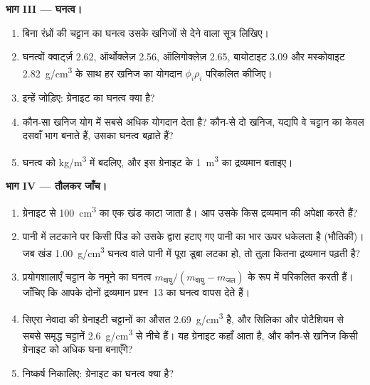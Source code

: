 \begin{problem}
\medskip
\noindent\textbf{भाग III --- घनत्व।}
\begin{enumerate}[resume]
  \item बिना रंध्रों की चट्टान का घनत्व उसके खनिजों से देने वाला सूत्र
        लिखिए।
  \item घनत्वों क्वार्ट्ज़ \qty{2.62}{}, ऑर्थोक्लेज़ \qty{2.56}{},
        ऑलिगोक्लेज़ \qty{2.65}{}, बायोटाइट \qty{3.09}{} और मस्कोवाइट
        \qty{2.82}{g/cm^3} के साथ हर खनिज का योगदान $\phi_i \rho_i$
        परिकलित कीजिए।
  \item इन्हें जोड़िए: ग्रेनाइट का घनत्व क्या है?
  \item कौन-सा खनिज योग में सबसे अधिक योगदान देता है? कौन-से दो खनिज,
        यद्यपि वे चट्टान का केवल दसवाँ भाग बनाते हैं, उसका घनत्व बढ़ाते हैं?
  \item घनत्व को \unit{kg/m^3} में बदलिए, और इस ग्रेनाइट के
        \qty{1}{m^3} का द्रव्यमान बताइए।
\end{enumerate}

\medskip
\noindent\textbf{भाग IV --- तौलकर जाँच।}
\begin{enumerate}[resume]
  \item ग्रेनाइट से \qty{100}{cm^3} का एक खंड काटा जाता है। आप उसके किस द्रव्यमान की
        अपेक्षा करते हैं?
  \item पानी में लटकाने पर किसी पिंड को उसके द्वारा हटाए गए पानी का भार ऊपर
        धकेलता है (भौतिकी)। जब खंड \qty{1.00}{g/cm^3} घनत्व वाले पानी में
        पूरा डूबा लटका हो, तो तुला कितना द्रव्यमान पढ़ती है?
  \item प्रयोगशालाएँ चट्टान के नमूने का घनत्व
        $m_{\text{वायु}}/(m_{\text{वायु}} - m_{\text{जल}})$ के रूप में परिकलित करती हैं। जाँचिए कि
        आपके दोनों द्रव्यमान प्रश्न~13 का घनत्व वापस देते हैं।
  \item सिएरा नेवादा की ग्रेनाइटी चट्टानों का औसत \qty{2.69}{g/cm^3} है, और
        सिलिका और पोटैशियम से सबसे समृद्ध चट्टानें \qty{2.6}{g/cm^3} से नीचे हैं।
        यह ग्रेनाइट कहाँ आता है, और कौन-से खनिज किसी
        ग्रेनाइट को अधिक घना बनाएँगे?
  \item निष्कर्ष निकालिए: ग्रेनाइट का घनत्व क्या है?
\end{enumerate}
\end{problem}
